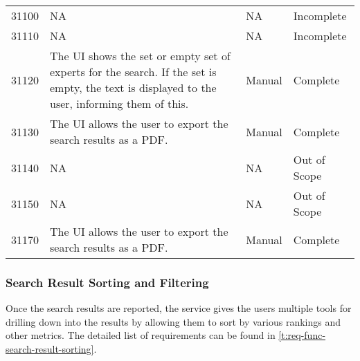 \begin{table}[ht!]
\begin{tabular}{l p{\requirementwidth} p{\matrixwidth} p{\matrixwidth}}
        31100 & NA & NA & Incomplete \\ 
        31110 & NA & NA & Incomplete \\ 
        31120 & The UI shows the set or empty set of experts for the search. If the set is empty, the text is displayed to the user, informing them of this. & Manual & Complete \\ 
        31130 & The UI allows the user to export the search results as a PDF. & Manual & Complete \\ 
        31140 & NA & NA & Out of Scope \\ 
        31150 & NA & NA & Out of Scope \\ 
        31170 & The UI allows the user to export the search results as a PDF. & Manual & Complete \\
    \end{tabular}
\end{table}

\subsubsection{Search Result Sorting and Filtering}

Once the search results are reported, the service gives the users multiple tools for drilling down into the results by allowing them to sort by various rankings and other metrics. The detailed list of requirements can be found in \autoref{t:req-func-search-result-sorting}.

